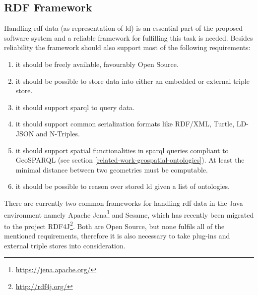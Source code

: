\documentclass[draft,final]{vutinfth} %
\begin{document}
\subsection{RDF Framework}
\label{solution-architectural-prototype:rdf-framework}
Handling \gls{rdf} data (as representation of \gls{ld}) is an essential part of the proposed software system and a reliable framework for fulfilling this task is needed. Besides reliability the framework should also support most of the following requirements:

\begin{enumerate}
	\item it should be freely available, favourably Open Source.
	\item it should be possible to store data into either an embedded or external triple store.
	\item it should support \gls{sparql} to query data.
	\item it should support common serialization formats like RDF/XML, Turtle, LD-JSON and N-Triples.
	\item it should support spatial functionalities in \gls{sparql} queries compliant to GeoSPARQL (see section \ref{related-work-geospatial-ontologies}). At least the minimal distance between two geometries must be computable.
	\item it should be possible to reason over stored \gls{ld} given a list of ontologies. 
\end{enumerate}

There are currently two common frameworks for handling \gls{rdf} data in the Java environment namely Apache Jena\footnote{\url{https://jena.apache.org/}} and Sesame, which has recently been migrated to the project RDF4J\footnote{\url{http://rdf4j.org/}}. Both are Open Source, but none fulfils all of the mentioned requirements, therefore it is also necessary to take plug-ins and external triple stores into consideration.
\end{document}

